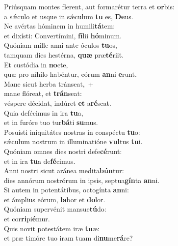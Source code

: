 \evenverse Priúsquam montes fíerent, aut formarétur terra et \textbf{or}bis:~\*\\
\evenverse a sǽculo et usque in sǽculum \textbf{tu} es, \textbf{De}us.\\
\oddverse Ne avértas hóminem in humili\textbf{tá}tem:~\*\\
\oddverse et dixísti: Convertímini, \textbf{fí}lii \textbf{hó}minum.\\
\evenverse Quóniam mille anni ante óculos \textbf{tu}os,~\*\\
\evenverse tamquam dies hestérna, \textbf{quæ} præ\textbf{té}riit.\\
\oddverse Et custódia in \textbf{no}cte,~\*\\
\oddverse quæ pro níhilo habéntur, eórum \textbf{an}ni \textbf{e}runt.\\
\evenverse Mane sicut herba tránseat,~+\\
\evenverse  mane flóreat, et \textbf{trán}seat:~\*\\
\evenverse véspere décidat, indúret \textbf{et} a\textbf{ré}scat.\\
\oddverse Quia defécimus in ira \textbf{tu}a,~\*\\
\oddverse et in furóre tuo tur\textbf{bá}ti \textbf{su}mus.\\
\evenverse Posuísti iniquitátes nostras in conspéctu \textbf{tu}o:~\*\\
\evenverse sǽculum nostrum in illuminatióne \textbf{vul}tus \textbf{tu}i.\\
\oddverse Quóniam omnes dies nostri defe\textbf{cé}runt:~\*\\
\oddverse et in ira \textbf{tu}a de\textbf{fé}cimus.\\
\evenverse Anni nostri sicut aránea medita\textbf{bún}tur:~\*\\
\evenverse dies annórum nostrórum in ipsis, septua\textbf{gín}ta \textbf{an}ni.\\
\oddverse Si autem in potentátibus, octogínta \textbf{an}ni:~\*\\
\oddverse et ámplius eórum, \textbf{la}bor et \textbf{do}lor.\\
\evenverse Quóniam supervénit mansue\textbf{tú}do:~\*\\
\evenverse et cor\textbf{ri}pi\textbf{é}mur.\\
\oddverse Quis novit potestátem iræ \textbf{tu}æ:~\*\\
\oddverse et præ timóre tuo iram tuam di\textbf{nu}me\textbf{rá}re?\\
